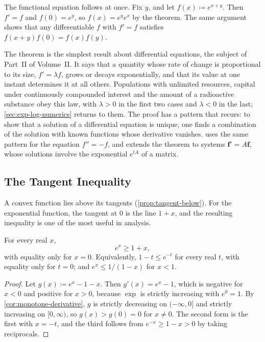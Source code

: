The functional equation follows at once. Fix $y$, and let $f(x)\coloneqq e^{x+y}$. Then $f'=f$ and $f(0)=e^y$, so $f(x)=e^ye^x$ by the theorem. The same argument shows that any differentiable $f$ with $f'=f$ satisfies $f(x+y)f(0)=f(x)f(y)$.

The theorem is the simplest result about differential equations, the subject of Part~II of Volume~II. It says that a quantity whose rate of change is proportional to its size, $f'=\lambda f$, grows or decays exponentially, and that its value at one instant determines it at all others. Populations with unlimited resources, capital under continuously compounded interest and the amount of a radioactive substance obey this law, with $\lambda>0$ in the first two cases and $\lambda<0$ in the last; \cref{sec:exp-log-numerics} returns to them. The proof has a pattern that recurs: to show that a solution of a differential equation is unique, one finds a combination of the solution with known functions whose derivative vanishes.  uses the same pattern for the equation $f''=-f$, and  extends the theorem to systems $\mathbf f'=A\mathbf f$, whose solutions involve the exponential $e^{tA}$ of a matrix.

\subsection{The Tangent Inequality}

A convex function lies above its tangents (\cref{prop:tangent-below}). For the exponential function, the tangent at $0$ is the line $1+x$, and the resulting inequality is one of the most useful in analysis.

\begin{proposition}
\label{prop:exp-tangent}
For every real $x$,
\[
e^x\ge1+x ,
\]
with equality only for $x=0$. Equivalently, $1-t\le e^{-t}$ for every real $t$, with equality only for $t=0$; and $e^x\le1/(1-x)$ for $x<1$.
\end{proposition}

\begin{proof}
Let $g(x)\coloneqq e^x-1-x$. Then $g'(x)=e^x-1$, which is negative for $x<0$ and positive for $x>0$, because $\exp$ is strictly increasing with $e^0=1$. By \cref{cor:monotone-derivative}, $g$ is strictly decreasing on $(-\infty,0]$ and strictly increasing on $[0,\infty)$, so $g(x)>g(0)=0$ for $x\ne0$. The second form is the first with $x=-t$, and the third follows from $e^{-x}\ge1-x>0$ by taking reciprocals.
\end{proof}


